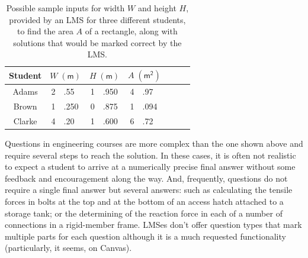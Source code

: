 \documentclass{tufte-handout}
\begin{document}
	\begin{table}[ht]
		\centering
		\selectfont
		\small%
		\begin{tabular}{cr@{}lr@{}lr@{}lcr@{}l}
			\toprule
			Student & \multicolumn{2}{c}{$W\;\mathsf{(m)}$} & \multicolumn{2}{c}{$H\;\mathsf{(m)}$} & \multicolumn{2}{c}{$A\;\mathsf{(m^2)}$}                                                          \\
			\midrule
			Adams   & 2                       & .55                     & 1                       & .950 & 4 & .97  \textcolor{Green4}{\Large\checkmark}  \\
			Brown   & 1                       & .250                    & 0                       & .875 & 1 & .094  \textcolor{Green4}{\Large\checkmark} \\
			Clarke  & 4                       & .20                     & 1                       & .600 & 6 & .72  \textcolor{Green4}{\Large\checkmark}  \\
			\bottomrule
		\end{tabular}
		\caption{Possible sample inputs for width $W$ and height $H$, provided by an LMS for three different students, to find the area $A$ of a rectangle, along with solutions that would be marked correct by the LMS. }
	\end{table}

\parm
Questions in engineering courses are more complex than the one shown above and require several steps to reach the solution. In these cases, it is often not realistic to expect a student to arrive at a numerically precise final answer without some feedback and encouragement along the way. And, frequently, questions do not require a single final answer but several answers: such as calculating the tensile forces in bolts at the top and at the bottom of an access hatch attached to a storage tank; or the determining of the reaction force in each of a number of connections in a rigid-member frame.
LMSes don't offer question types that mark multiple parts for each question although it is a much requested functionality (particularly, it seems, on Canvas).
\end{document}
